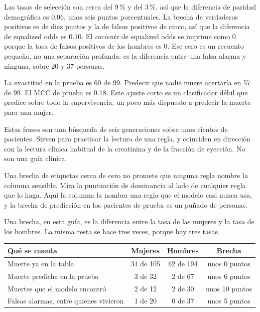 \documentclass[11pt]{article}
\newcommand{\pct}[1]{\mbox{#1\,\%}}
\begin{document}
Las tasas de selección son cerca del \pct{9} y del \pct{3}, así que la diferencia de paridad demográfica es 0.06, unos seis puntos porcentuales. La brecha de verdaderos positivos es de diez puntos y la de falsos positivos de cinco, así que la diferencia de equalized odds es 0.10. El \emph{cociente} de equalized odds se imprime como 0 porque la tasa de falsos positivos de los hombres es 0. Ese cero es un recuento pequeño, no una separación profunda: es la diferencia entre una falsa alarma y ninguna, sobre 20 y 37 personas.

La exactitud en la prueba es 60 de 99. Predecir que nadie muere acertaría en 57 de 99. El MCC de prueba es 0.18. Este ajuste corto es un clasificador débil que predice sobre todo la supervivencia, un poco más dispuesto a predecir la muerte para una mujer.

\begin{careful}
Estas frases son una búsqueda de seis generaciones sobre unos cientos de pacientes. Sirven para practicar la lectura de una regla, y coinciden en dirección con la lectura clínica habitual de la creatinina y de la fracción de eyección. No son una guía clínica.
\end{careful}

\begin{lesson}
Una brecha de etiquetas cerca de cero no promete que ninguna regla nombre la columna sensible. Mira la puntuación de dominancia al lado de cualquier regla que lo haga. Aquí la columna la nombra una regla que el modelo casi nunca usa, y la brecha de predicción en los pacientes de prueba es un puñado de personas.
\end{lesson}

Una brecha, en esta guía, es la diferencia entre la tasa de las mujeres y la tasa de los hombres. La misma resta se hace tres veces, porque hay tres tasas.

\begin{table}[H]
\centering
\small
\begin{tabularx}{\textwidth}{@{}Y c c c@{}}
\toprule
Qué se cuenta & Mujeres & Hombres & Brecha \\
\midrule
Muerte ya en la tabla & 34 de 105 & 62 de 194 & unos 0 puntos \\
Muerte predicha en la prueba & 3 de 32 & 2 de 67 & unos 6 puntos \\
Muertes que el modelo encontró & 2 de 12 & 2 de 30 & unos 10 puntos \\
Falsas alarmas, entre quienes vivieron & 1 de 20 & 0 de 37 & unos 5 puntos \\
\bottomrule
\end{tabularx}
\end{table}
\end{document}
